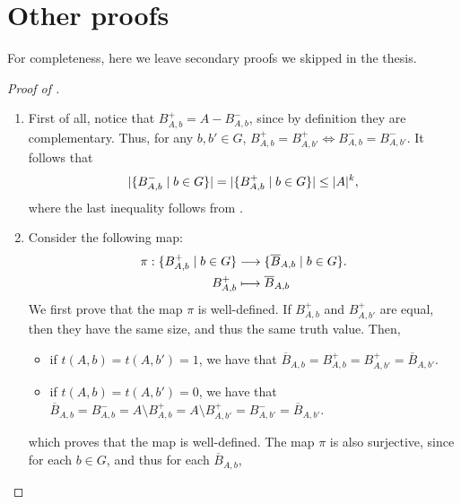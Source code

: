 \appendix

\vfill\newpage \section{Other proofs} \label{sec:appendix_other_proofs}

    For completeness, here we leave secondary proofs we skipped in the thesis.

    \begin{proof}[Proof of ]
        \begin{enumerate}
            \item First of all, notice that $B^+_{A,b} = A - B^-_{A,b}$, since by definition they are complementary.
                Thus, for any $b, b' \in G$, $B^+_{A,b} = B^+_{A,b'} \Leftrightarrow B^-_{A,b} = B^-_{A,b'}$.
                It follows that
                \[
                    | \{ B^-_{A,b} \mid b \in G \} | =
                    | \{ B^+_{A,b} \mid b \in G \} | \leq |A|^k,
                \]
                where the last inequality follows from .
            \item Consider the following map:
                \begin{align*}
                    \pi: \{ B^+_{A,b} \mid b \in G \} & \longrightarrow \{ \overline{B}_{A,b} \mid b \in G \}. \\
                                                 B^+_{A,b} & \longmapsto \overline{B}_{A,b}
                \end{align*}
                We first prove that the map $\pi$ is well-defined.
                If $B^+_{A,b}$ and $B^+_{A,b'}$ are equal, then they have the same size, and thus the same truth value.
                Then,
                \begin{itemize}
                    \item if $t(A,b) = t(A,b') = 1$, we have that $\overline{B}_{A,b} = B^+_{A,b} = B^+_{A,b'} = \overline{B}_{A,b'}$.
                    \item if $t(A,b) = t(A,b') = 0$, we have that
                    $\overline{B}_{A,b} = B^-_{A,b} = A \setminus B^+_{A,b} = A \setminus B^+_{A,b'} = B^-_{A,b'} = \overline{B}_{A,b'}$.
                \end{itemize}
                which proves that the map is well-defined.
                The map $\pi$ is also surjective, since for each $b \in G$, and thus for each $\overline{B}_{A,b}$,

\end{enumerate}
\end{proof}
